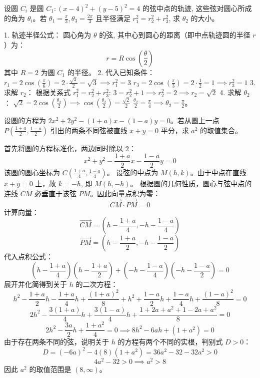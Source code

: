 \begin{questions}
\question
设圆 $C_i$ 是圆 $C_1 : (x - 4)^2 + (y - 5)^2 = 4$ 的弦中点的轨迹, 这些弦对圆心所成的角为 $\theta_i$。若 $\theta_1 = \frac{\pi}{3}, \theta_3 = \frac{2\pi}{3}$ 且半径满足 $r_1^2 = r_2^2 + r_3^2$, 求 $\theta_2$ 的大小。

\begin{solution}
1. 轨迹半径公式：
   圆心角为 $\theta$ 的弦, 其中心到圆心的距离（即中点轨迹圆的半径 $r$）为：
   \[ r = R \cos\left( \frac{\theta}{2} \right) \]
   其中 $R = 2$ 为圆 $C_1$ 的半径。
2. 代入已知条件：
   $r_1 = 2 \cos\left( \frac{\pi}{6} \right) = 2 \cdot \frac{\sqrt{3}}{2} = \sqrt{3} \implies r_1^2 = 3$
   $r_3 = 2 \cos\left( \frac{\pi}{3} \right) = 2 \cdot \frac{1}{2} = 1 \implies r_3^2 = 1$
3. 求解 $r_2$：
   根据关系式 $r_1^2 = r_2^2 + r_3^2$:
   $3 = r_2^2 + 1 \implies r_2^2 = 2 \implies r_2 = \sqrt{2}$
4. 求解 $\theta_2$：
   $\sqrt{2} = 2 \cos\left( \frac{\theta_2}{2} \right) \implies \cos\left( \frac{\theta_2}{2} \right) = \frac{\sqrt{2}}{2}$
   $\frac{\theta_2}{2} = \frac{\pi}{4} \implies \theta_2 = \frac{\pi}{2}$。
\end{solution}

\question
设圆的方程为 $2x^2 + 2y^2 - (1 + a)x - (1 - a)y = 0$。若从圆上一点 $P\left( \frac{1 + a}{2}, \frac{1 - a}{2} \right)$ 引出的两条不同弦被直线 $x + y = 0$ 平分，求 $a^2$ 的取值集合。

\begin{solution}
首先将圆的方程标准化，两边同时除以 $2$：
\[
x^2 + y^2 - \frac{1 + a}{2}x - \frac{1 - a}{2}y = 0
\]
该圆的圆心坐标为 $C\left( \frac{1 + a}{4}, \frac{1 - a}{4} \right)$。
设弦的中点为 $M(h, k)$。由于中点在直线 $x + y = 0$ 上，故 $k = -h$, 即 $M(h, -h)$。
根据圆的几何性质，圆心与弦中点的连线 $CM$ 必垂直于该弦 $PM$。因此向量点积为零：
\[
\vec{CM} \cdot \vec{PM} = 0
\]
计算向量：
\[
\vec{CM} = \left( h - \frac{1 + a}{4}, -h - \frac{1 - a}{4} \right)
\]
\[
\vec{PM} = \left( h - \frac{1 + a}{2}, -h - \frac{1 - a}{2} \right)
\]
代入点积公式：
\[
\left( h - \frac{1 + a}{4} \right)\left( h - \frac{1 + a}{2} \right) + \left( -h - \frac{1 - a}{4} \right)\left( -h - \frac{1 - a}{2} \right) = 0
\]
展开并化简得到关于 $h$ 的二次方程：
\[
h^2 - \frac{1 + a}{2}h - \frac{1 + a}{4}h + \frac{(1 + a)^2}{8} + h^2 + \frac{1 - a}{2}h + \frac{1 - a}{4}h + \frac{(1 - a)^2}{8} = 0
\]
\[
2h^2 - \frac{3(1 + a)}{4}h + \frac{3(1 - a)}{4}h + \frac{1 + 2a + a^2 + 1 - 2a + a^2}{8} = 0
\]
\[
2h^2 - \frac{3a}{2}h + \frac{1 + a^2}{4} = 0 \implies 8h^2 - 6ah + (1 + a^2) = 0
\]
由于存在两条不同的弦，说明关于 $h$ 的方程有两个不同的实根，判别式 $D > 0$：
\[
D = (-6a)^2 - 4(8)(1 + a^2) = 36a^2 - 32 - 32a^2 > 0
\]
\[
4a^2 - 32 > 0 \implies a^2 > 8
\]
因此 $a^2$ 的取值范围是 $(8, \infty)$。
\end{solution}


\end{questions}
